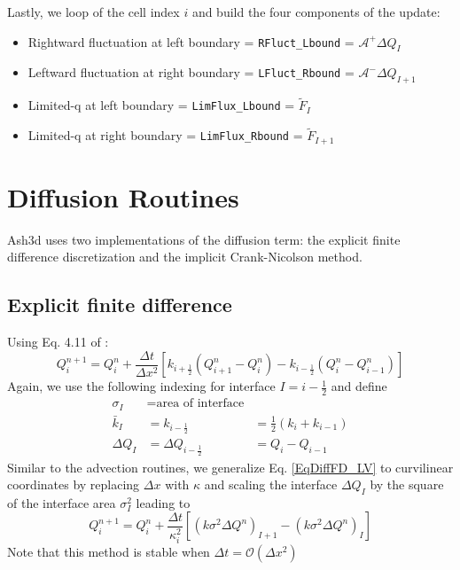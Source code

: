 Lastly, we loop of the cell index $i$ and build the four components of the update:
\begin{itemize}
 \item Rightward fluctuation at left boundary = \texttt{RFluct\_Lbound} = $\mathcal{A}^{+} \Delta Q_I$
 \item Leftward fluctuation at right boundary = \texttt{LFluct\_Rbound} = $\mathcal{A}^{-} \Delta Q_{I+1}$
 \item Limited-q at left boundary = \texttt{LimFlux\_Lbound} = $\widetilde{F}_I$
 \item Limited-q at right boundary = \texttt{LimFlux\_Rbound} = $\widetilde{F}_{I+1} $
\end{itemize}


\section{Diffusion Routines}
Ash3d uses two implementations of the diffusion term: the explicit finite difference
discretization and the implicit Crank-Nicolson method.  

\subsection{Explicit finite difference}
Using Eq. 4.11 of \cite{LeVeque03}:
\begin{equation}\label{EqDiffFD_LV}
Q^{n+1}_i = Q^{n}_i + \frac{\Delta t}{\Delta x^2} \left[ k_{i+\frac{1}{2}}\left( Q^{n}_{i+1}-Q^{n}_{i}\right) -
k_{i-\frac{1}{2}}\left( Q^{n}_{i}-Q^{n}_{i-1}\right) \right]
\end{equation}
Again, we use the following indexing for interface $I=i-\frac{1}{2}$ and define
\begin{align*}
\sigma_I &= \text{area of interface} &  \\
\bar{k}_I &= k_{i-\frac{1}{2}} &= \frac{1}{2}\left( k_i + k_{i-1} \right)\\
\Delta Q_I &= \Delta Q_{i-\frac{1}{2}} &= Q_i - Q_{i-1} 
\end{align*}
Similar to the advection routines, we generalize Eq. \ref{EqDiffFD_LV} to curvilinear coordinates by replacing
$\Delta x$ with $\kappa$ and scaling the interface $\Delta Q_I$ by the square of the
interface area $\sigma_I^2$ leading to
\begin{equation}\label{EqDiffFD}
Q^{n+1}_i = Q^{n}_i + \frac{\Delta t}{\kappa_i^2} \left[ 
\left( k \sigma^2 \Delta Q^n \right)_{I+1} - 
\left( k \sigma^2 \Delta Q^n \right)_I  \right]
\end{equation}
Note that this method is stable when $\Delta t = \mathcal{O}(\Delta x^2)$

